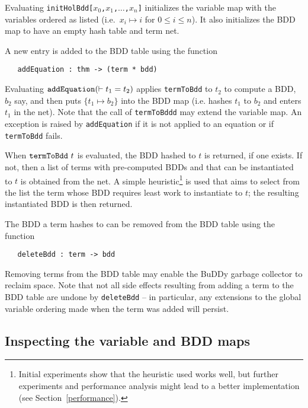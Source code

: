 \documentclass[12pt]{article}
\newcommand{\bnind}[1]{\index[MLbn]{#1}}
\renewcommand{\t}[1]{\mbox{\tt #1}}
\newcommand{\ty}[1]{\mbox{\tt #1}}
\newcommand{\ml}[1]{{\tt #1}}
\newcommand{\Buddy}{BuDDy\xspace}
\newcommand\fun{\mbox{\tt{->}}}
\renewcommand{\prod}{\mbox{\tt{*}}}
\begin{document}
Evaluating \t{initHolBdd[$x_0$,$x_1$,$\ldots$,$x_n$]} initializes
the variable map with the variables ordered as listed
(i.e.~$x_i\mapsto i$ for $0\leq i\leq n$). It also initializes
the BDD map to have an empty hash table and term net.

A new entry is added to the BDD table using the function

%
%

\begin{verbatim}
   addEquation : thm -> (term * bdd)
\end{verbatim}\bnind{\ml{addEquation}}

Evaluating $\t{addEquation}(\vdash t_1 = t_2)$ applies \t{termToBdd} to
$t_2$ to compute a BDD, $b_2$ say, and then puts $\{t_1\mapsto b_2\}$ into
the BDD map (i.e. hashes $t_1$ to $b_2$ and enters $t_1$ in the net).
Note that the call of \t{termToBddd} may extend the variable map.
An exception is raised by \t{addEquation} if it is not applied
to an equation or if \t{termToBdd} fails.

When $\t{termToBdd}~t$ is evaluated, the BDD hashed to $t$ is
returned, if one exists. If not, then a list of terms with
pre-computed BDDs and that can be instantiated to $t$ is obtained from
the net.  A simple heuristic\footnote{Initial experiments show that
the heuristic used works well, but further experiments and performance
analysis might lead to a better implementation (see
Section~\ref{performance}).} is used that aims to select from the list
the term whose BDD requires least work to instantiate to $t$; the
resulting instantiated BDD is then returned.

The BDD a term hashes to can be removed from the BDD table using the function

%
%

\begin{verbatim}
   deleteBdd : term -> bdd
\end{verbatim}\bnind{\ml{deleteBdd}}

Removing terms from the BDD table may enable the \Buddy{} garbage
collector to reclaim space.  Note that not all side effects resulting
from adding a term to the BDD table are undone by \t{deleteBdd} -- in
particular, any extensions to the global variable ordering made when
the term was added will persist.

\subsection{Inspecting the variable and BDD maps}
\end{document}
